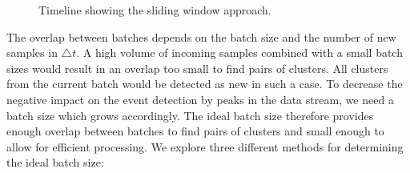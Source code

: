 \begin{figure}[h]
    \centering


    \caption{Timeline showing the sliding window approach.}
    \label{fig:timeline}
\end{figure}

The overlap between batches depends on the batch size and the number of new samples in $\triangle t$.
A high volume of incoming samples combined with a small batch sizes
would result in an overlap too small to find pairs of clusters.
All clusters from the current batch would be detected as new in such a case.
To decrease the negative impact on the event detection by peaks in the data stream,
we need a batch size which grows accordingly.
The ideal batch size therefore provides enough overlap between batches to find pairs of clusters
and small enough to allow for efficient processing.
We explore three different methods for determining the ideal batch size:

